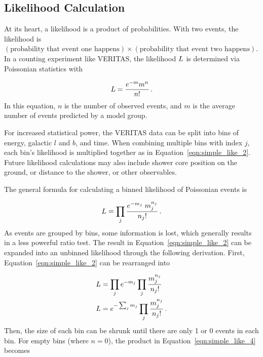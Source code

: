 \subsection{Likelihood Calculation}
At its heart, a likelihood is a product of probabilities.
With two events, the likelihood is $(\textrm{probability that event one happens})\times(\textrm{probability that event two happens})$.
In a counting experiment like VERITAS, the likelihood $L$ is determined via Poissonian statistics with

\begin{equation}\label{eqn:simple_like}
  L = \frac{e^{-m} m^n}{n!} \,.
\end{equation}
In this equation, $n$ is the number of observed events, and $m$ is the average number of events predicted by a model group.

For increased statistical power, the VERITAS data can be split into bins of energy, galactic $l$ and $b$, and time.
When combining multiple bins with index $j$, each bin's likelihood is multiplied together as in Equation~\ref{eqn:simple_like_2}.
Future likelihood calculations may also include shower core position on the ground, or distance to the shower, or other observables.

The general formula for calculating a binned likelihood of Poissonian events is

\begin{equation}\label{eqn:simple_like_2}
  L = \prod_j \frac{ e^{-m_j} \; m_{j}^{n_j}}{n_{j}!} \,.
\end{equation}
As events are grouped by bins, some information is lost, which generally results in a less powerful ratio test.
The result in Equation~\ref{eqn:simple_like_2} can be expanded into an unbinned likelihood through the following derivation.
First, Equation~\ref{eqn:simple_like_2} can be rearranged into

\begin{equation}\label{eqn:simple_like_4}
  \begin{aligned}
    L &= \prod_j e^{-m_j} \prod_j \frac{m_j^{n_j}}{n_{j}!} \\
    L &= e^{- \sum_j m_j} \prod_j \frac{m_j^{n_j}}{n_{j}!} \,.
  \end{aligned}
\end{equation}
Then, the size of each bin can be shrunk until there are only 1 or 0 events in each bin.
For empty bins (where $n=0$), the product in Equation~\ref{eqn:simple_like_4} becomes

